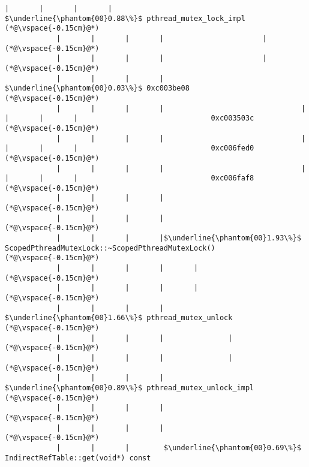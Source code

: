 \begin{lstlisting}[caption=Unicode-merkkijonon osoitinoperaatio, label=profile:C2JReadUnicode-512, numberbychapter=true, frame=lines, float, floatplacement=t]
            |       |       |       |                $\underline{\phantom{00}0.88\%}$ pthread_mutex_lock_impl
(*@\vspace{-0.15cm}@*)
            |       |       |       |                       |
(*@\vspace{-0.15cm}@*)
            |       |       |       |                       |
(*@\vspace{-0.15cm}@*)
            |       |       |       |                        $\underline{\phantom{00}0.03\%}$ 0xc003be08
(*@\vspace{-0.15cm}@*)
            |       |       |       |                                |       |       |       |                               0xc003503c
(*@\vspace{-0.15cm}@*)
            |       |       |       |                                |       |       |       |                               0xc006fed0
(*@\vspace{-0.15cm}@*)
            |       |       |       |                                |       |       |       |                               0xc006faf8
(*@\vspace{-0.15cm}@*)
            |       |       |       |
(*@\vspace{-0.15cm}@*)
            |       |       |       |
(*@\vspace{-0.15cm}@*)
            |       |       |       |$\underline{\phantom{00}1.93\%}$ ScopedPthreadMutexLock::~ScopedPthreadMutexLock()
(*@\vspace{-0.15cm}@*)
            |       |       |       |       |
(*@\vspace{-0.15cm}@*)
            |       |       |       |       |
(*@\vspace{-0.15cm}@*)
            |       |       |       |        $\underline{\phantom{00}1.66\%}$ pthread_mutex_unlock
(*@\vspace{-0.15cm}@*)
            |       |       |       |               |
(*@\vspace{-0.15cm}@*)
            |       |       |       |               |
(*@\vspace{-0.15cm}@*)
            |       |       |       |                $\underline{\phantom{00}0.89\%}$ pthread_mutex_unlock_impl
(*@\vspace{-0.15cm}@*)
            |       |       |       |
(*@\vspace{-0.15cm}@*)
            |       |       |       |
(*@\vspace{-0.15cm}@*)
            |       |       |        $\underline{\phantom{00}0.69\%}$ IndirectRefTable::get(void*) const

\end{lstlisting}
